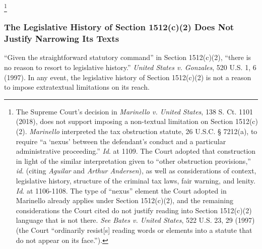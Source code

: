 \footnote{The Supreme Court’s decision in \textit{Marinello v. United States}, 138 S. Ct. 1101 (2018), does not support imposing a non-textual limitation on Section 1512(c)(2).
\textit{Marinello} interpreted the tax obstruction statute, 26 U.S.C. § 7212(a), to require “a ‘nexus’ between the defendant’s conduct and a particular administrative proceeding.”
\textit{Id}. at 1109.
The Court adopted that construction in light of the similar interpretation given to “other obstruction provisions,” \textit{id}. (citing \textit{Aguilar} and \textit{Arthur Andersen}), as well as considerations of context, legislative history, structure of the criminal tax laws, fair warning, and lenity.
\textit{Id}. at 1106-1108.
The type of “nexus” element the Court adopted in Marinello already applies under Section 1512(c)(2), and the remaining considerations the Court cited do not justify reading into Section 1512(c)(2) language that is not there.
\textit{See Bates v. United States}, 522 U.S. 23, 29 (1997) (the Court “ordinarily resist[s] reading words or elements into a statute that do not appear on its face.”).}

\subsubsection{The Legislative History of Section 1512(c)(2) Does Not Justify Narrowing Its Texts}

“Given the straightforward statutory command” in Section 1512(c)(2), “there is no reason to resort to legislative history.”
\textit{United States v. Gonzales}, 520 U.S. 1, 6 (1997).
In any event, the legislative history of Section 1512(c)(2) is not a reason to impose extratextual limitations on its reach.

